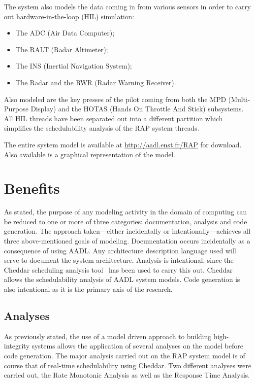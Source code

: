 The system also models the data coming in from various sensors in
order to carry out hardware-in-the-loop (HIL) simulation:

\begin{itemize}
\item The ADC (Air Data Computer);
\item The RALT (Radar Altimeter);
\item The INS (Inertial Navigation System);
\item The Radar and the RWR (Radar Warning Receiver).
\end{itemize}

Also modeled are the key presses of the pilot coming from both the MPD
(Multi-Purpose Display) and the HOTAS (Hands On Throttle And Stick)
subsystems. All HIL threads have been separated out into a different
partition which simplifies the schedulability analysis of the RAP
system threads.

The entire \aadl system model is available at
\hbox{\url{http://aadl.enst.fr/RAP}} for download. Also available is a
graphical representation of the model.

\section{Benefits}
\label{benefits}
As stated, the purpose of any modeling activity in the domain of
computing can be reduced to one or more of three categories:
documentation, analysis and code generation. The approach
taken---either incidentally or intentionally---achieves all three
above-mentioned goals of modeling. Documentation occurs incidentally
as a consequence of using AADL. Any architecture description language
used will serve to document the system architecture. Analysis is
intentional, since the Cheddar scheduling analysis
tool~\cite{singhoff@alj04} has been used to carry this out. Cheddar
allows the schedulability analysis of AADL system models. Code
generation is also intentional as it is the primary axis of the
research.

\subsection{Analyses}
As previously stated, the use of a model driven approach to building
high-integrity systems allows the application of several analyses on
the model before code generation. The major analysis carried out on
the RAP system model is of course that of real-time schedulability using
Cheddar. Two different analyses were carried out, the Rate Monotonic
Analysis as well as the Response Time Analysis.


